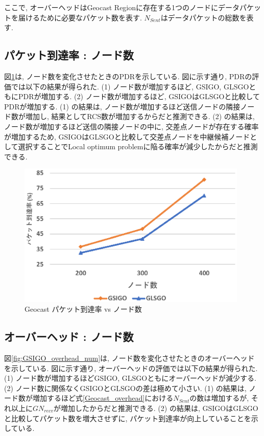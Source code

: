 \documentclass[10pt]{jreport}
\begin{document}
ここで, オーバーヘッドはGeocast Regionに存在する1つのノードにデータパケットを届けるために必要なパケット数を表す.
$N_{Sent}$はデータパケットの総数を表す. 

\subsection{パケット到達率 : ノード数}
図\ref{fig:GSIGO_PDR_num}は, ノード数を変化させたときのPDRを示している.
図に示す通り, PDRの評価では以下の結果が得られた.
(1) ノード数が増加するほど, GSIGO, GLSGOともにPDRが増加する. 
(2) ノード数が増加するほど, GSIGOはGLSGOと比較してPDRが増加する.
(1) の結果は, ノード数が増加するほど送信ノードの隣接ノード数が増加し, 結果としてRCS数が増加するからだと推測できる.
(2) の結果は, ノード数が増加するほど送信の隣接ノードの中に, 交差点ノードが存在する確率が増加するため, GSIGOはGLSGOと比較して交差点ノードを中継候補ノードとして選択することでLocal optimum problemに陥る確率が減少したからだと推測できる.


\begin{figure}[!ht]
	\centering
	\includegraphics[width=110mm]{figures/GSIGO_PDR_num.eps}
	\caption{Geocast パケット到達率 vs ノード数}
	\label{fig:GSIGO_PDR_num}
\end{figure}

\subsection{オーバーヘッド : ノード数}

図\ref{fig:GSIGO_overhead_num}は, ノード数を変化させたときのオーバーヘッドを示している.
図に示す通り, オーバーヘッドの評価では以下の結果が得られた.
(1) ノード数が増加するほどGSIGO, GLSGOともにオーバーヘッドが減少する.
(2) ノード数に関係なくGSIGOとGLSGOの差は極めて小さい.
(1) の結果は, ノード数が増加するほど式\ref{Geocast_overhead}における$N_{Sent}$の数は増加するが, それ以上に$GN_{recv}$が増加したからだと推測できる.
(2) の結果は, GSIGOはGLSGOと比較してパケット数を増大させずに, パケット到達率が向上していることを示している. 
\end{document}
